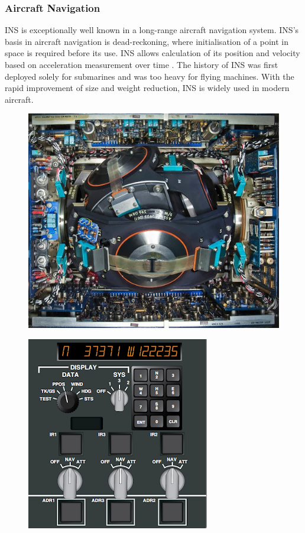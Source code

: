 \subsubsection{Aircraft Navigation}
INS is exceptionally well known in a long-range aircraft navigation system. INS's basis in aircraft navigation is dead-reckoning, where initialisation of a point in space is required before its use. INS allows calculation of its position and velocity based on acceleration measurement over time \cite{El-Sheimy2020InertialTrends}\cite{Loewy2003AircraftAvionics}. The history of INS was first deployed solely for submarines and was too heavy for flying machines. With the rapid improvement of size and weight reduction, INS is widely used in modern aircraft.


\begin{figure}[!ht]
\centering
\begin{minipage}{.48\textwidth}
  \centering
  \includegraphics[height=0.8\linewidth]{Figures/INS_Concorde.jpg}
  \label{fig:concordeINS}
\end{minipage}%
\begin{minipage}{.6\textwidth}
  \centering
  \includegraphics[height=0.8\linewidth]{Figures/INS-IRS_InterfacePanel.png}

\end{minipage}
\end{figure}
